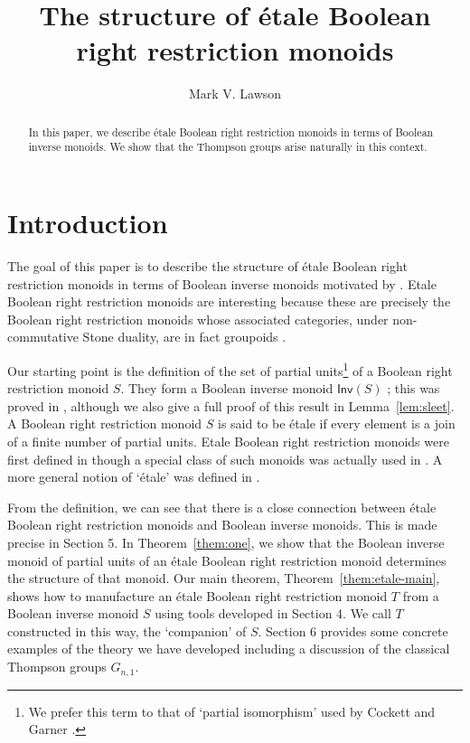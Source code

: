 \documentclass[a4paper]{amsart}
\title{The structure of \'etale Boolean right restriction monoids}
\author{Mark V. Lawson}
\begin{document}
\begin{abstract}
In this paper, we describe \'etale Boolean right restriction monoids in terms of Boolean inverse monoids. 
We show that the Thompson groups arise naturally in this context.
\end{abstract}
\maketitle


\section{Introduction}

The goal of this paper is to describe the structure of \'etale Boolean right restriction monoids in terms of Boolean inverse monoids motivated by \cite{CG, G1, G2}.
Etale Boolean right restriction monoids are interesting
because these are precisely the Boolean right restriction monoids 
whose associated categories, under non-commutative Stone duality,
are in fact groupoids  \cite[Theorem 5.2]{G2}.

Our starting point is the definition of the set of partial units\footnote{We prefer this term to that of `partial isomorphism' used by Cockett and Garner \cite{CG}.} 
of a Boolean right restriction monoid $S$. 
They form a Boolean inverse monoid $\mathsf{Inv}(S)$ \cite{Wehrung};
this was proved in \cite{CG, G2}, although we also give a full proof of this result in Lemma~\ref{lem:sleet}. 
A Boolean right restriction monoid $S$ is said to be \'etale if every element is a join of a finite number of partial units.
Etale Boolean right restriction monoids were first defined in \cite{G2}
though a special class of such monoids was actually used in \cite{Lawson2021b}.
A more general notion of `\'etale' was defined in \cite{CG}.

From the definition, we can see that there is a close connection
between \'etale Boolean right restriction monoids and Boolean inverse monoids.
This is made precise in Section 5.
In Theorem~\ref{them:one}, 
we show that the Boolean inverse monoid of partial units of an \'etale Boolean right restriction monoid determines the structure of that monoid.
Our main theorem,  Theorem~\ref{them:etale-main}, 
shows how to manufacture an \'etale Boolean right restriction monoid $T$ from a Boolean inverse monoid $S$
using tools developed in Section 4.
We call $T$ constructed in this way, the `companion' of $S$.
Section 6 provides some concrete examples of the theory we have developed including a discussion of the classical Thompson groups $G_{n,1}$.
\end{document}
